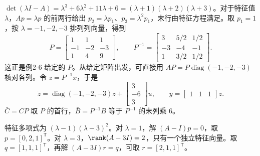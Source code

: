 
\sol $\det(\lambda I-A)=\lambda^3+6\lambda^2+11\lambda+6=(\lambda+1)(\lambda+2)(\lambda+3)$。对于特征值 $\lambda$，$Ap=\lambda p$ 的前两行给出 $p_2=\lambda p_1$、$p_3=\lambda^2p_1$，末行由特征方程满足。取 $p_1=1$，按 $\lambda=-1,-2,-3$ 排列列向量，得到
\[
P=\begin{bmatrix}1&1&1\\-1&-2&-3\\1&4&9\end{bmatrix},\qquad
P^{-1}=\begin{bmatrix}3&5/2&1/2\\-3&-4&-1\\1&3/2&1/2\end{bmatrix}.
\]
这正是例2-6 给定的 $P$。从给定矩阵出发，可直接用 $AP=P\operatorname{diag}(-1,-2,-3)$ 核对各列。令 $z=P^{-1}x$，于是
\[
\dot z=\operatorname{diag}(-1,-2,-3)z+
\begin{bmatrix}3\\-6\\3\end{bmatrix}u,\qquad
y=\begin{bmatrix}1&1&1\end{bmatrix}z.
\]
$\bar C=CP$ 取 $P$ 的首行，$\bar B=P^{-1}B$ 等于 $P^{-1}$ 的末列乘 6。



\sol 特征多项式为 $(\lambda-1)(\lambda-3)^2$。对 $\lambda=1$，解 $(A-I)p=0$，取 $p=[0,2,1]^{\mathsf T}$。对 $\lambda=3$，$\rank(A-3I)=2$，只有一个独立特征向量。取 $q=[1,1,1]^{\mathsf T}$，再解 $(A-3I)r=q$，可取 $r=[2,1,1]^{\mathsf T}$。

